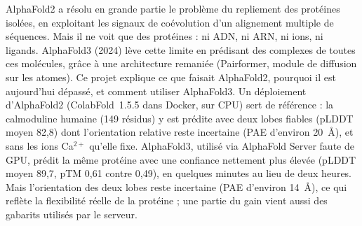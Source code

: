 AlphaFold2 a résolu en grande partie le problème du repliement des protéines isolées, en exploitant les signaux de coévolution d'un alignement multiple de séquences. Mais il ne voit que des protéines : ni ADN, ni ARN, ni ions, ni ligands. AlphaFold3 (2024) lève cette limite en prédisant des complexes de toutes ces molécules, grâce à une architecture remaniée (Pairformer, module de diffusion sur les atomes). Ce projet explique ce que faisait AlphaFold2, pourquoi il est aujourd'hui dépassé, et comment utiliser AlphaFold3. Un déploiement d'AlphaFold2 (ColabFold~1.5.5 dans Docker, sur CPU) sert de référence : la calmoduline humaine (149 résidus) y est prédite avec deux lobes fiables (pLDDT moyen 82,8) dont l'orientation relative reste incertaine (PAE d'environ 20~Å), et sans les ions Ca$^{2+}$ qu'elle fixe. AlphaFold3, utilisé via AlphaFold Server faute de GPU, prédit la même protéine avec une confiance nettement plus élevée (pLDDT moyen 89,7, pTM 0,61 contre 0,49), en quelques minutes au lieu de deux heures. Mais l'orientation des deux lobes reste incertaine (PAE d'environ 14~Å), ce qui reflète la flexibilité réelle de la protéine ; une partie du gain vient aussi des gabarits utilisés par le serveur.
